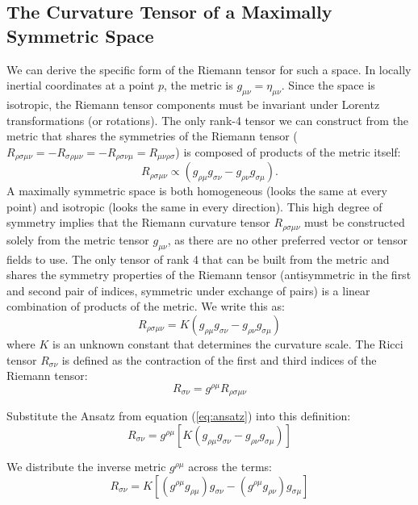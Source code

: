 \documentclass[11pt, a4paper]{report}
\begin{document}
\subsection*{The Curvature Tensor of a Maximally Symmetric Space}
We can derive the specific form of the Riemann tensor for such a space. In locally inertial coordinates at a point $p$, the metric is $g_{\mu\nu} = \eta_{\mu\nu}$. Since the space is isotropic, the Riemann tensor components must be invariant under Lorentz transformations (or rotations).
The only rank-4 tensor we can construct from the metric that shares the symmetries of the Riemann tensor ($R_{\rho\sigma\mu\nu} = -R_{\sigma\rho\mu\nu} = -R_{\rho\sigma\nu\mu} = R_{\mu\nu\rho\sigma}$) is composed of products of the metric itself:
\begin{equation}
R_{\rho\sigma\mu\nu} \propto (g_{\rho\mu} g_{\sigma\nu} - g_{\rho\nu} g_{\sigma\mu}).
\end{equation}
A maximally symmetric space is both homogeneous (looks the same at every point) and isotropic (looks the same in every direction). This high degree of symmetry implies that the Riemann curvature tensor $R_{\rho\sigma\mu\nu}$ must be constructed solely from the metric tensor $g_{\mu\nu}$, as there are no other preferred vector or tensor fields to use.
The only tensor of rank 4 that can be built from the metric and shares the symmetry properties of the Riemann tensor (antisymmetric in the first and second pair of indices, symmetric under exchange of pairs) is a linear combination of products of the metric.
We write this as:
\begin{equation}
    R_{\rho\sigma\mu\nu} = K (g_{\rho\mu} g_{\sigma\nu} - g_{\rho\nu} g_{\sigma\mu}) \label{eq:ansatz}
\end{equation}
where $K$ is an unknown constant that determines the curvature scale.
The Ricci tensor $R_{\sigma\nu}$ is defined as the contraction of the first and third indices of the Riemann tensor:
\begin{equation}
    R_{\sigma\nu} = g^{\rho\mu} R_{\rho\sigma\mu\nu}
\end{equation}

Substitute the Ansatz from equation (\ref{eq:ansatz}) into this definition:
\begin{equation}
    R_{\sigma\nu} = g^{\rho\mu} [ K (g_{\rho\mu} g_{\sigma\nu} - g_{\rho\nu} g_{\sigma\mu}) ]
\end{equation}

We distribute the inverse metric $g^{\rho\mu}$ across the terms:
\begin{equation}
    R_{\sigma\nu} = K [ (g^{\rho\mu} g_{\rho\mu}) g_{\sigma\nu} - (g^{\rho\mu} g_{\rho\nu}) g_{\sigma\mu} ]
\end{equation}
\end{document}
